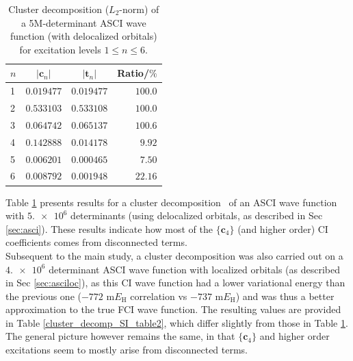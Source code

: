 \documentclass[journal=jcp,manuscript=suppinfo]{achemso}
\begin{document}
%
\begin{table}[ht!]
\begin{center}
\caption{Cluster decomposition ($L_2$-norm) of a 5M-determinant ASCI wave function (with delocalized orbitals) for excitation levels $1 \leq n \leq 6$.}
\label{cluster_decomp_SI_table}
\begin{tabular}{l|r|r|r}
\toprule
\multicolumn{1}{c|}{$n$} & \multicolumn{1}{c|}{$|\bm{c}_n|$} & \multicolumn{1}{c|}{$|\bm{t}_n|$} & \multicolumn{1}{c}{Ratio/$\%$} \\
\midrule\midrule
1 & $0.019477$ & $0.019477$ & $100.0$ \\
2 & $0.533103$ & $0.533108$ & $100.0$ \\
3 & $0.064742$ & $0.065137$ & $100.6$ \\
4 & $0.142888$ & $0.014178$ & $9.92$ \\
5 & $0.006201$ & $0.000465$ & $7.50$ \\
6 & $0.008792$ & $0.001948$ & $22.16$ \\
\midrule
\end{tabular}
\vspace{-0.6cm}
\end{center}
\end{table}
%
Table \ref{cluster_decomp_SI_table} presents results for a cluster decomposition~\cite{lehtola_head_gordon_fci_decomp_jcp_2017} of an ASCI wave function with $\num{5.e6}$ determinants (using delocalized orbitals, as described in Sec \ref{sec:asci}). These results indicate how most of the $\{\bm{c}_4\}$ (and higher order) CI coefficients comes from disconnected terms.\\

Subsequent to the main study, a cluster decomposition was also carried out on a $\num{4.e6}$ determinant ASCI wave function with localized orbitals (as described in Sec \ref{sec:asciloc}), as this CI wave function had a lower variational energy than the previous one ($-772$ m$E_{\text{H}}$ correlation vs $-737$ m$E_{\text{H}}$) and was thus a better approximation to the true FCI wave function. The resulting values are provided in Table \ref{cluster_decomp_SI_table2}, which differ slightly from those in Table \ref{cluster_decomp_SI_table}. The general picture however remains the same, in that $\{\bm{c}_4\}$ and higher order excitations seem to mostly arise from disconnected terms. 
\end{document}
